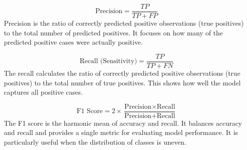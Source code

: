 \[
\text{Precision} = \frac{TP}{TP + FP}
\]
Precision is the ratio of correctly predicted positive observations (true positives) to the total number of predicted positives. It focuses on how many of the predicted positive cases were actually positive.

\[
\text{Recall (Sensitivity)} = \frac{TP}{TP + FN}
\]
The recall calculates the ratio of correctly predicted positive observations (true positives) to the total number of true positives. This shows how well the model captures all positive cases.

\[
\text{F1 Score} = 2 \times \frac{\text{Precision} \times \text{Recall}}{\text{Precision} + \text{Recall}}
\]
The F1 score is the harmonic mean of accuracy and recall. It balances accuracy and recall and provides a single metric for evaluating model performance. It is particularly useful when the distribution of classes is uneven.
